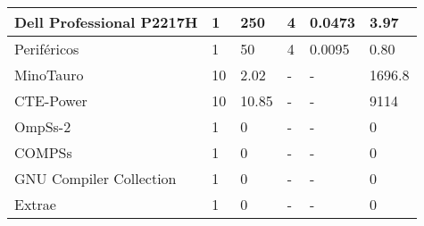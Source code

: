 \begin{longtable}{l|l|l|l|l|l|}
\multicolumn{1}{|l|}{Dell Professional P2217H}                                                                                      & 1                               & 250                     & 4                       & 0.0473                  & 3.97                            \\ \hline
\multicolumn{1}{|l|}{Periféricos}                                                                                                   & 1                               & 50                      & 4                       & 0.0095                  & 0.80                            \\ \hline
\multicolumn{1}{|l|}{MinoTauro}                                                                                                     & 10                              & 2.02                    & -                       & -                       & 1696.8                          \\ \hline
\multicolumn{1}{|l|}{CTE-Power}                                                                                                     & 10                              & 10.85                   & -                       & -                       & 9114                            \\ \hline
\multicolumn{1}{|l|}{OmpSs-2}                                                                                                       & 1                               & 0                       & -                       & -                       & 0                               \\ \hline
\multicolumn{1}{|l|}{COMPSs}                                                                                                        & 1                               & 0                       & -                       & -                       & 0                               \\ \hline
\multicolumn{1}{|l|}{GNU Compiler Collection}                                                                                       & 1                               & 0                       & -                       & -                       & 0                               \\ \hline
\multicolumn{1}{|l|}{Extrae}                                                                                                        & 1                               & 0                       & -                       & -                       & 0                               \\ \hline

\end{longtable}

